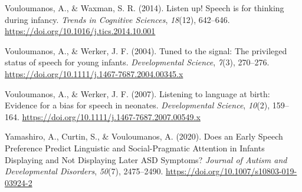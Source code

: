 \documentclass[
  man,mask,floatsintext]{apa6}
\newlength{\cslhangindent}
\newlength{\cslentryspacingunit} %
\newenvironment{CSLReferences}[2] %
 {%
  \setlength{\parindent}{0pt}
  \ifodd #1
  \let\oldpar\par
  \def\par{\hangindent=\cslhangindent\oldpar}
  \fi
  \setlength{\parskip}{#2\cslentryspacingunit}
 }%
 {}
\begin{document}
\begin{CSLReferences}{1}{0}
\leavevmode{}%
Vouloumanos, A., \& Waxman, S. R. (2014). Listen up! {Speech} is for thinking during infancy. \emph{Trends in Cognitive Sciences}, \emph{18}(12), 642--646. \url{https://doi.org/10.1016/j.tics.2014.10.001}

\leavevmode{}%
Vouloumanos, A., \& Werker, J. F. (2004). Tuned to the signal: The privileged status of speech for young infants. \emph{Developmental Science}, \emph{7}(3), 270--276. \url{https://doi.org/10.1111/j.1467-7687.2004.00345.x}

\leavevmode{}%
Vouloumanos, A., \& Werker, J. F. (2007). Listening to language at birth: Evidence for a bias for speech in neonates. \emph{Developmental Science}, \emph{10}(2), 159--164. \url{https://doi.org/10.1111/j.1467-7687.2007.00549.x}

\leavevmode{}%
Yamashiro, A., Curtin, S., \& Vouloumanos, A. (2020). Does an {Early} {Speech} {Preference} {Predict} {Linguistic} and {Social}-{Pragmatic} {Attention} in {Infants} {Displaying} and {Not} {Displaying} {Later} {ASD} {Symptoms}? \emph{Journal of Autism and Developmental Disorders}, \emph{50}(7), 2475--2490. \url{https://doi.org/10.1007/s10803-019-03924-2}

\end{CSLReferences}

\endgroup
\end{document}
